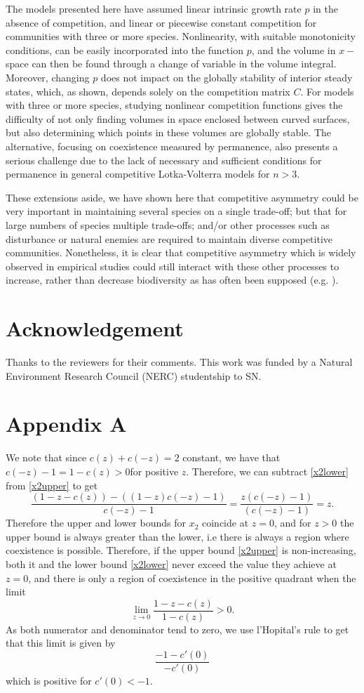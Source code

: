 The models presented here have assumed linear intrinsic growth rate $p$ in the absence of competition, and linear or piecewise constant competition for communities with three or more species. Nonlinearity, with suitable monotonicity conditions, can be easily incorporated into the function $p$, and the volume in $x-$space can then be found through a change of variable in the volume integral. Moreover, changing $p$ does not impact on the globally stability of interior steady states, which, as shown, depends solely on the competition matrix $C$. For models with three or more species, studying nonlinear competition functions gives the difficulty of not only finding volumes in space enclosed between curved surfaces, but also determining which points in these volumes are globally stable. The alternative, focusing on coexistence measured by permanence, also presents a serious challenge due to the lack of necessary and sufficient conditions for permanence in general competitive Lotka-Volterra models for $n>3$.

These extensions aside, we have shown here that competitive asymmetry could be very important in maintaining several species on a single trade-off; but that for large numbers of species multiple trade-offs; and/or other processes such as disturbance or natural enemies are required to maintain diverse competitive communities. Nonetheless, it is clear that competitive asymmetry which is widely observed in empirical studies could still interact with these other processes to increase, rather than decrease biodiversity as has often been supposed (e.g. \cite{keddy1997experimental, resetarits1995competitive}).

\section*{Acknowledgement}

Thanks to the reviewers for their comments. This work was funded by a Natural Environment Research Council (NERC) studentship to SN.

\section*{Appendix A}

We note that since $c(z)+c(-z)=2$ constant, we have that $c(-z)-1=1-c(z)>0$for positive $z$. Therefore, we can subtract \eqref{x2lower} from \eqref{x2upper} to get
\[
\frac{(1-z-c(z))-((1-z)c(-z)-1)}{c(-z)-1}=\frac{z(c(-z)-1)}{(c(-z)-1)}=z.
\]
Therefore the upper and lower bounds for $x_2$ coincide at $z=0$, and for $z>0$ the upper bound is always greater than the lower, i.e there is always a region where coexistence is possible. Therefore, if the upper bound \eqref{x2upper} is non-increasing, both it and the lower bound \eqref{x2lower} never exceed the value they achieve at $z=0$, and there is only a region of coexistence in the positive quadrant when the limit
\[
\lim_{z \to 0}\frac{1-z-c(z)}{1-c(z)} >0.
\]
As both numerator and denominator tend to zero, we use l'Hopital's rule to get that this limit is given by
\[
\frac{-1-c'(0)}{-c'(0)}
\]
which is positive for $c'(0)<-1$.

